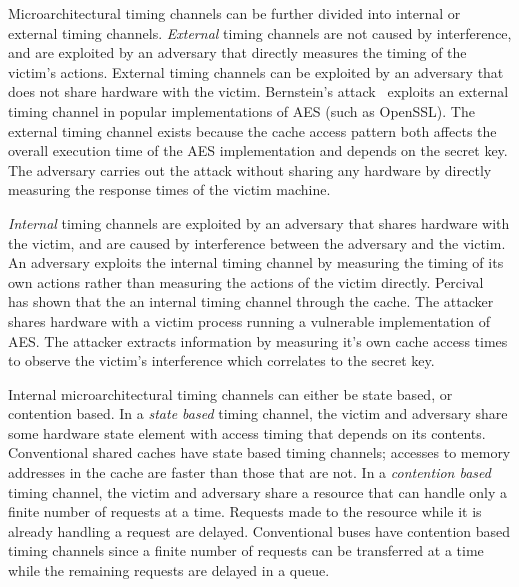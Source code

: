 Microarchitectural timing channels can be further divided into internal or 
external timing channels. \emph{External} timing channels are not caused by 
interference, and are exploited by an adversary that directly measures the 
timing of the victim's actions. External timing channels can be exploited by an 
adversary that does not share hardware with the victim. Bernstein's 
attack~\cite{bernstein} exploits an external timing channel in popular 
implementations of AES (such as OpenSSL). The external timing channel exists 
because the cache access pattern both affects the overall execution time of the 
AES implementation and depends on the secret key. The adversary carries out the 
attack without sharing any hardware by directly measuring the response times of 
the victim machine.

\emph{Internal} timing channels are exploited by an adversary that shares 
hardware with the victim, and are caused by interference between the adversary 
and the victim. An adversary exploits the internal timing channel by measuring 
the timing of its own actions rather than measuring the actions of the victim 
directly. Percival~\cite{percival} has shown that the an internal timing 
channel through the cache. The attacker shares hardware with a victim process 
running a vulnerable implementation of AES. The attacker extracts information 
by measuring it's own cache access times to observe the victim's interference 
which correlates to the secret key.

Internal microarchitectural timing channels can either be state based, or 
contention based. In a \emph{state based} timing channel, the victim and 
adversary share some hardware state element with access timing that depends on 
its contents. Conventional shared caches have state based timing channels; 
accesses to memory addresses in the cache are faster than those that are not.
In a \emph{contention based} timing channel, the victim and adversary share a 
resource that can handle only a finite number of requests at a time.  Requests 
made to the resource while it is already handling a request are delayed. 
Conventional buses have contention based timing channels since a finite number 
of requests can be transferred at a time while the remaining requests are 
delayed in a queue.

